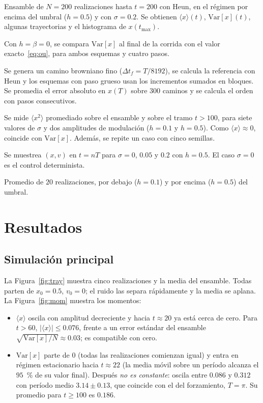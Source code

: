 \documentclass[12pt,a4paper]{article}
\newcommand{\media}[1]{\langle #1\rangle}
\begin{document}
\begin{description}[leftmargin=!,labelwidth=2.2cm,style=nextline]
    \item[Simulación principal.] Ensamble de $N=200$ realizaciones hasta $t=200$ con Heun, en el régimen por encima del umbral ($h=0.5$) y con $\sigma=0.2$. Se obtienen $\media{x}(t)$, $\mathrm{Var}[x](t)$, algunas trayectorias y el histograma de $x(t_{\max})$.
    \item[3a. Validación lineal.] Con $h=\beta=0$, se compara $\mathrm{Var}[x]$ al final de la corrida con el valor exacto~\eqref{eq:ou}, para ambos esquemas y cuatro pasos.
    \item[3b. Convergencia fuerte.] Se genera un camino browniano fino ($\Delta t_f=T/8192$), se calcula la referencia con Heun y los esquemas con paso grueso usan los incrementos sumados en bloques. Se promedia el error absoluto en $x(T)$ sobre $300$ caminos y se calcula el orden con pasos consecutivos.
    \item[3c. Dependencia con $\sigma$.] Se mide $\media{x^{2}}$ promediado sobre el ensamble y sobre el tramo $t>100$, para siete valores de $\sigma$ y dos amplitudes de modulación ($h=0.1$ y $h=0.5$). Como $\media{x}\approx0$, coincide con $\mathrm{Var}[x]$. Además, se repite un caso con cinco semillas.
    \item[3d. Mapa estroboscópico.] Se muestrea $(x,v)$ en $t=nT$ para $\sigma=0$, $0.05$ y $0.2$ con $h=0.5$. El caso $\sigma=0$ es el control determinista.
    \item[3e. Autocorrelación y espectro.] Promedio de $20$ realizaciones, por debajo ($h=0.1$) y por encima ($h=0.5$) del umbral.
\end{description}

\section{Resultados}

\subsection{Simulación principal}

La Figura~\ref{fig:tray} muestra cinco realizaciones y la media del ensamble. Todas parten de $x_0=0.5$, $v_0=0$; el ruido las separa rápidamente y la media se aplana. La Figura~\ref{fig:mom} muestra los momentos:

\begin{itemize}
    \item $\media{x}$ oscila con amplitud decreciente y hacia $t\approx20$ ya está cerca de cero. Para $t>60$, $|\media{x}|\le0.076$, frente a un error estándar del ensamble $\sqrt{\mathrm{Var}[x]/N}\approx0.03$; es compatible con cero.
    \item $\mathrm{Var}[x]$ parte de $0$ (todas las realizaciones comienzan igual) y entra en régimen estacionario hacia $t\approx22$ (la media móvil sobre un período alcanza el $95$~\% de su valor final). Después \emph{no es constante}: oscila entre $0.086$ y $0.312$ con período medio $3.14\pm0.13$, que coincide con el del forzamiento, $T=\pi$. Su promedio para $t\ge100$ es $0.186$.
\end{itemize}
\end{document}
